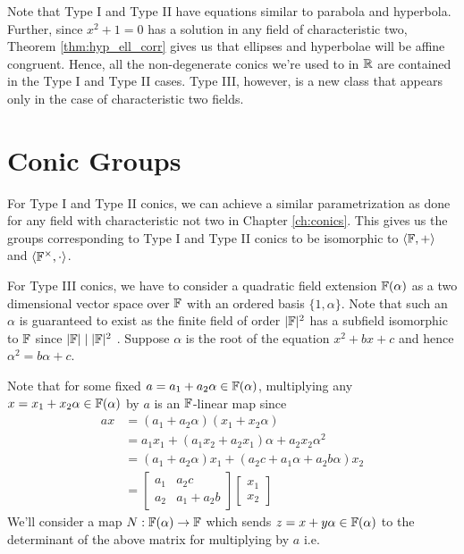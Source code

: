 \noindent
Note that Type I and Type II have equations similar to parabola and hyperbola.
Further, since $x^2 + 1 = 0$ has a solution in any field of characteristic two,
Theorem \ref{thm:hyp_ell_corr} gives us that ellipses and hyperbolae will be
affine congruent. Hence, all the non-degenerate conics we're used to in $\mathbb{R}$ are
contained in the Type I and Type II cases. Type III, however, is a new class that
appears only in the case of characteristic two fields.


\section{Conic Groups}

For Type I and Type II conics, we can achieve a similar parametrization as done
for any field with characteristic not two in Chapter \ref{ch:conics}. This gives
us the groups corresponding to Type I and Type II conics to be isomorphic to
$\langle\mathbb{F},+\rangle$ and $\langle\mathbb{F}^\times,\cdot\rangle$.
\vspace{1ex}

\noindent
For Type III conics, we have to consider a quadratic field extension $\mathbb{F}(\alpha)$
as a two dimensional vector space over $\mathbb{F}$ with an ordered basis $\{1,\alpha\}$.
Note that such an $\alpha$ is guaranteed to exist as the finite field of order
$|\mathbb{F}|^2$ has a subfield isomorphic to $\mathbb{F}$ since $|\mathbb{F}|\mid|\mathbb{F}|^2$
\cite[\S14.3]{dummit}.
Suppose $\alpha$ is the root of the equation $x^2 + bx + c$ and hence
$\alpha^2 = b\alpha+c$.

Note that for some fixed $a=a_1+a_2\alpha\in\mathbb{F}(\alpha)$, multiplying any
$x=x_1+x_2\alpha\in\mathbb{F}(\alpha)$ by $a$ is an $\mathbb{F}$-linear map since
\begin{align*}
    ax &= (a_1+a_2\alpha)(x_1+x_2\alpha) \\
       &= a_1 x_1 + (a_1 x_2 + a_2 x_1)\alpha + a_2 x_2 \alpha^2 \\
       &= (a_1 + a_2\alpha)x_1 + (a_2 c + a_1\alpha + a_2 b\alpha)x_2 \\
       &= \begin{bmatrix}a_1 & a_2 c \\ a_2 & a_1 + a_2 b\end{bmatrix}
          \begin{bmatrix}x_1 \\ x_2\end{bmatrix}
   \end{align*}
We'll consider a map $N:\mathbb{F}(\alpha)\to\mathbb{F}$ which sends $z=x+y\alpha\in\mathbb{F}(\alpha)$ to
the determinant of the above matrix for multiplying by $a$ i.e.

